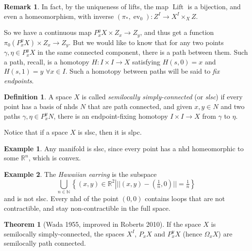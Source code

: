 \documentclass{tufte-handout}
\def\RR{\mathbb{R}}
\DeclareMathOperator{\ev}{ev}
\DeclareMathOperator{\Lift}{Lift}
\theoremstyle{definition}
\newtheorem{definition}{Definition}
\newtheorem{example}{Example}
\newtheorem{theorem}{Theorem}
\newtheorem*{rem}{Remark}
\begin{document}
\begin{rem}
In fact, by the uniqueness of lifts, the map $\Lift$ is a bijection, and even a homeomorphism, with inverse $(\pi_*,\ev_0)\colon Z^I \to X^I \times _X Z$.
\end{rem}

So we have a continuous map $P_x^y X\times Z_x \to Z_y$, and thus get a function $\pi_0(P_x^yX) \times Z_x \to Z_y$.
But we would like to know that for any two points $\gamma,\eta\in P_x^yX$ in the same connected component, there is a path between them.
Such a path, recall, is a homotopy $H\colon I \times I \to X$ satisfying $H(s,0)=x$ and $H(s,1)=y$ $\forall x\in I$. Such a homotopy between paths will be said to \emph{fix endpoints}.


\begin{definition}
A space $X$ is called \emph{semilocally simply-connected}
 (or \emph{slsc}) if every point has a basis of nhds $N$ that are path connected, and given 
$x,y\in N$ and two paths $\gamma,\eta \in P_x^y N$, there is an endpoint-fixing homotopy 
$I\times I \to X$ from $\gamma$ to $\eta$.
\end{definition}

Notice that if a space $X$ is slsc, then it is slpc.

\begin{example}
Any manifold is slsc, since every point has a nhd homeomorphic to some $\RR^n$, 
which is convex.
\end{example}

\begin{example}
The \emph{Hawaiian earring} is the subspace 
\[
	\bigcup_{n\in \mathbb{N}} \left\{(x,y)\in \RR^2 \left| 
			||(x,y) - (\tfrac1n,0)|| = \tfrac1n\right.\right\}
\]
and is not slsc. Every nhd of the point $(0,0)$ contains loops that are not contractible, and
stay non-contractible in the full space.
\end{example}


\begin{theorem}[Wada 1955, improved in Roberts 2010]
If 
the space $X$ is semilocally simply-connected, 
the spaces $X^I$, $P_xX$ and $P_x^yX$ (hence $\Omega_xX$) are semilocally path connected.
\end{theorem}
\end{document}
